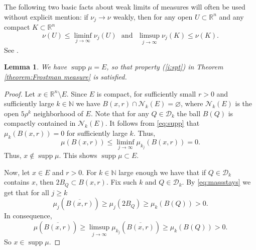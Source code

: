 \documentclass[11pt,reqno]{amsart}
\def\dN{{\mathcal{N}}}
\newtheorem{lemma}[theorem]{Lemma}
\theoremstyle{definition}
\theoremstyle{remark}
\numberwithin{equation}{section}
\newcommand{\R}{\mathbb{R}}
\newcommand{\N}{\mathbb{N}}
\newcommand{\dD}{\mathcal{D}}
\newcommand{\DD}{\mathcal{D}}
\DeclareMathOperator{\supp}{supp}
\theoremstyle{theorem}
\theoremstyle{definition}
\theoremstyle{remark}
\numberwithin{equation}{section}
\begin{document}
The following two basic facts about weak limits of measures will often be used without explicit mention: if $\nu_j \to \nu$ weakly, then for any open $U\subset \R^n$ and any compact $K \subset \R^n$
\begin{equation*}
	\nu (U) \leq \liminf_{j \to \infty} \nu_j(U) \,\, \mbox{ and } \,\, \limsup_{j \to \infty}\nu_j(K) \leq \nu(K). 
\end{equation*}
See \cite[Theorem 1.24]{mattila}.

\begin{lemma}
	We have $\supp\mu = E$, so that property (\ref{i:spt}) in Theorem \ref{theorem:Frostman measure} is satisfied.
\end{lemma}
\begin{proof}
	Let $x \in \R^n \setminus E$. Since $E$ is compact, for sufficiently small $r>0$ and sufficiently large $k \in \N$ we have $B(x,r) \cap \dN_{k}(E) = \varnothing$, where $\dN_{k}(E)$ is the open $5\rho^{k}$ neighborhood of $E$. Note that for any $Q \in \dD_{k}$ the ball $B(Q)$ is compactly contained in $\dN_{k}(E)$. It follows from \eqref{eq:supp} that $\mu_{k}(B(x,r))=0$ for sufficiently large $k$. Thus,
	\begin{equation*}
	\mu(B(x,r)) \leq \liminf_{j \to \infty} \mu_{k_j}(B(x,r))=0.
	\end{equation*}
	Thus, $x\notin\supp\mu$. This shows $\supp\mu \subset E$. 
	
	Now, let $x\in E$ and $r>0$. For $k\in \N$ large enough we have that if $Q\in\DD_k$ contains $x$, then $2B_Q\subset B(x,r)$. Fix such $k$ and $Q\in\DD_k$. By \eqref{eq:massstays} we get that for all $j\ge k$
	\begin{equation*}
	\mu_j(\overline{B(x,r)})\ge \mu_j(2B_Q)\ge \mu_k(B(Q))>0.
	\end{equation*}
	In consequence,
	\begin{equation*}
	\mu(\overline{B(x,r)}) \ge \limsup_{j \to \infty} \mu_{k_j}(\overline{B(x,r)})\ge \mu_k(B(Q))>0. 
	\end{equation*}
	So $x\in\supp\mu$.
\end{proof}
\end{document}
